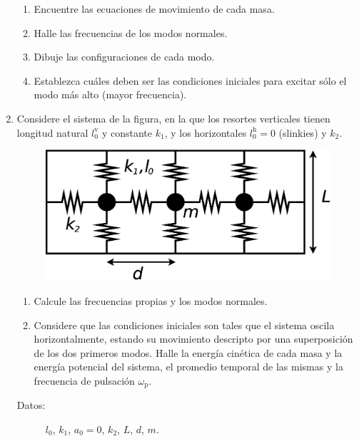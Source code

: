 \documentclass[11pt,spanish]{article}
\begin{document}
\begin{enumerate}
    \begin{enumerate}
        \item Encuentre las ecuaciones de movimiento de cada masa. 
        \item Halle las frecuencias de los modos normales. 
        \item Dibuje las configuraciones de cada modo. 
        \item Establezca cuáles deben ser las condiciones iniciales para excitar
        sólo el modo más alto (mayor frecuencia).
    \end{enumerate}


    \item Considere el sistema de la figura, en la que los resortes verticales
    tienen longitud natural $l_{0}^\text{v}$ y constante $k_{1}$, y los horizontales
    $l_{0}^\text{h}=0$ (slinkies) y $k_{2}$.

    \begin{figure}[H]
        \centering{}\includegraphics[clip,scale=0.25]{figs/ej1-10}
    \end{figure}

    \begin{enumerate}
        \item Calcule las frecuencias propias y los modos normales.

        \item Considere que las condiciones iniciales son tales que el sistema
        oscila horizontalmente, estando su movimiento descripto por una
        superposición de los dos primeros modos. Halle la energía cinética de
        cada masa y la energía potencial del sistema, el promedio temporal de
        las mismas y la frecuencia de pulsación $\omega_\text{p}$.
    \end{enumerate}

    \begin{description}
        \item [{Datos:}] $l_{0}$, $k_{1}$, $a_{0}=0$, $k_{2}$, $L$, $d$,
    $m$.
    \end{description}



\end{enumerate}
\end{document}
